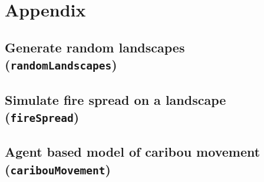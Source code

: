 \documentclass{article}
\begin{document}
\section{Appendix}
\renewcommand{\thesubsection}{\Alph{subsection}}

\subsection{Generate random landscapes (\texttt{randomLandscapes})}


\newpage

\subsection{Simulate fire spread on a landscape (\texttt{fireSpread})}


\newpage

\subsection{Agent based model of caribou movement (\texttt{caribouMovement})}
\end{document}
